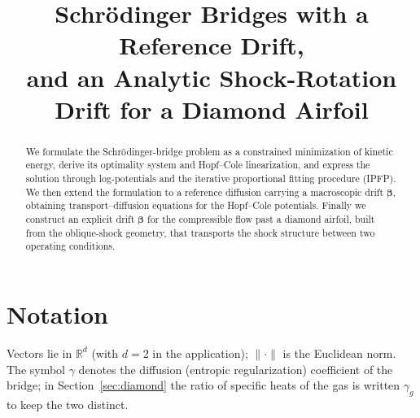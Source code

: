 \documentclass[11pt]{article}
\title{\textbf{Schr\"odinger Bridges with a Reference Drift,\\
and an Analytic Shock-Rotation Drift for a Diamond Airfoil}}
\author{}
\date{}
\theoremstyle{remark}
\newcommand{\bt}{\boldsymbol{\beta}}
\newcommand{\Rd}{\mathbb{R}^d}
\begin{document}
\maketitle

\begin{abstract}
We formulate the Schr\"odinger-bridge problem as a constrained minimization of
kinetic energy, derive its optimality system and Hopf--Cole linearization, and
express the solution through log-potentials and the iterative proportional
fitting procedure (IPFP). We then extend the formulation to a reference diffusion
carrying a macroscopic drift $\bt$, obtaining transport--diffusion equations for
the Hopf--Cole potentials. Finally we construct an explicit drift $\bt$ for the
compressible flow past a diamond airfoil, built from the oblique-shock geometry,
that transports the shock structure between two operating conditions.
\end{abstract}

\tableofcontents

\section{Notation}

Vectors lie in $\Rd$ (with $d=2$ in the application); $\|\cdot\|$ is the
Euclidean norm. The symbol $\gamma$ denotes the diffusion (entropic
regularization) coefficient of the bridge; in Section~\ref{sec:diamond} the
ratio of specific heats of the gas is written $\gamma_g$ to keep the two
distinct.
\end{document}
